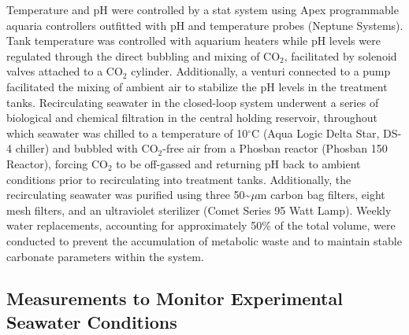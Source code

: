 \documentclass{CSUNthesis}
\begin{document}
Temperature and pH were controlled by a stat system using Apex programmable aquaria controllers outfitted with pH and temperature probes (Neptune Systems). Tank temperature was controlled with aquarium heaters while pH levels were regulated through the direct bubbling and mixing of CO\(_2\), facilitated by solenoid valves attached to a CO\(_2\) cylinder. Additionally, a venturi connected to a pump facilitated the mixing of ambient air to stabilize the pH levels in the treatment tanks. Recirculating seawater in the closed-loop system underwent a series of biological and chemical filtration in the central holding reservoir, throughout which seawater was chilled to a temperature of 10\(^\circ\)C (Aqua Logic Delta Star, DS-4 chiller) and bubbled with CO\(_2\)-free air from a Phosban reactor (Phosban 150 Reactor), forcing CO\(_2\) to be off-gassed and returning pH back to ambient conditions prior to recirculating into treatment tanks. Additionally, the recirculating seawater was purified using three 50\textasciitilde{}\(\mu\)m carbon bag filters, eight mesh filters, and an ultraviolet sterilizer (Comet Series 95 Watt Lamp). Weekly water replacements, accounting for approximately 50\% of the total volume, were conducted to prevent the accumulation of metabolic waste and to maintain stable carbonate parameters within the system.

\subsection*{Measurements to Monitor Experimental Seawater Conditions}\label{measurements-to-monitor-experimental-seawater-conditions}
\end{document}
